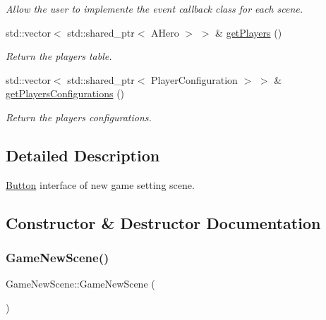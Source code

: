 \begin{DoxyCompactItemize}
\begin{DoxyCompactList}\small\item\em Allow the user to implemente the event callback class for each scene. \end{DoxyCompactList}\item 
\mbox{\label{classGameNewScene_a2fb7cacfacbf5c565c3e2f98bd06aec4}} 
std\+::vector$<$ std\+::shared\+\_\+ptr$<$ A\+Hero $>$ $>$ \& \hyperlink{classGameNewScene_a2fb7cacfacbf5c565c3e2f98bd06aec4}{get\+Players} ()
\begin{DoxyCompactList}\small\item\em Return the players table. \end{DoxyCompactList}\item 
\mbox{\label{classGameNewScene_a8ec7d1675e6be7490aee15126d8f2026}} 
std\+::vector$<$ std\+::shared\+\_\+ptr$<$ Player\+Configuration $>$ $>$ \& \hyperlink{classGameNewScene_a8ec7d1675e6be7490aee15126d8f2026}{get\+Players\+Configurations} ()
\begin{DoxyCompactList}\small\item\em Return the players configurations. \end{DoxyCompactList}\end{DoxyCompactItemize}


\subsection{Detailed Description}
\hyperlink{classButton}{Button} interface of new game setting scene. 

\subsection{Constructor \& Destructor Documentation}
\mbox{\label{classGameNewScene_af482b13a2d9e315ef39a6e41293bf4fb}} 
\subsubsection{\texorpdfstring{Game\+New\+Scene()}{GameNewScene()}}
{\footnotesize\ttfamily Game\+New\+Scene\+::\+Game\+New\+Scene (\begin{DoxyParamCaption}{ }\end{DoxyParamCaption})}




